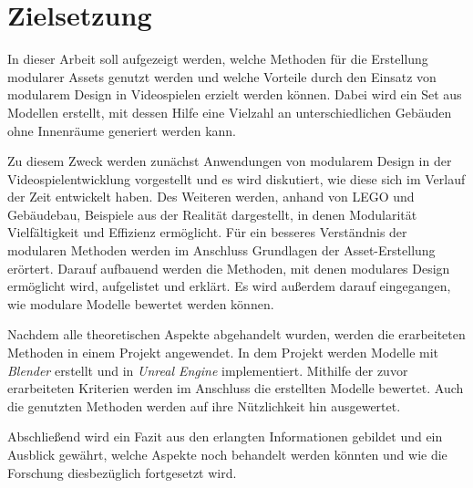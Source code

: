 \section{Zielsetzung}
In dieser Arbeit soll aufgezeigt werden, welche Methoden für die Erstellung modularer Assets genutzt werden und welche Vorteile durch den Einsatz von modularem Design in Videospielen erzielt werden können. Dabei wird ein Set aus Modellen erstellt, mit dessen Hilfe eine Vielzahl an unterschiedlichen Gebäuden ohne Innenräume generiert werden kann.
\par
Zu diesem Zweck werden zunächst Anwendungen von modularem Design in der Videospielentwicklung vorgestellt und es wird diskutiert, wie diese sich im Verlauf der Zeit entwickelt haben. Des Weiteren werden, anhand von LEGO und Gebäudebau, Beispiele aus der Realität dargestellt, in denen Modularität Vielfältigkeit und Effizienz ermöglicht. Für ein besseres Verständnis der modularen Methoden werden im Anschluss Grundlagen der Asset-Erstellung erörtert. Darauf aufbauend werden die Methoden, mit denen modulares Design ermöglicht wird, aufgelistet und erklärt. Es wird außerdem darauf eingegangen, wie modulare Modelle bewertet werden können.
\par
Nachdem alle theoretischen Aspekte abgehandelt wurden, werden die erarbeiteten Methoden in einem Projekt angewendet. In dem Projekt werden Modelle mit \textit{Blender} erstellt und in \textit{Unreal Engine} implementiert. Mithilfe der zuvor erarbeiteten Kriterien werden im Anschluss die erstellten Modelle bewertet. Auch die genutzten Methoden werden auf ihre Nützlichkeit hin ausgewertet.
\par
Abschließend wird ein Fazit aus den erlangten Informationen gebildet und ein Ausblick gewährt, welche Aspekte noch behandelt werden könnten und wie die Forschung diesbezüglich fortgesetzt wird.
